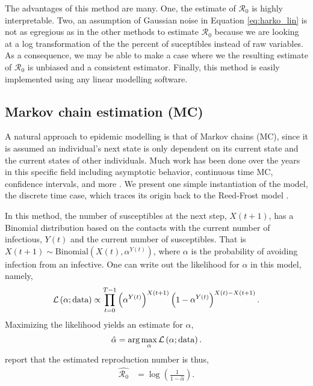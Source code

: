 \message{ !name(draft_v13.tex)}\documentclass[12pt]{article}
\newcommand{\rr}{\ensuremath{\mathcal{R}_0}}
\begin{document}
The advantages of this method are many.  One, the estimate of $\rr$ is highly interpretable.  Two, an assumption of Gaussian noise in Equation \ref{eq:harko_lin} is not as egregious as in the other methods to estimate $\rr$ because we are looking at a log transformation of the the percent of suceptibles instead of raw variables.  As a consequence, we may be able to make a case where we the resulting estimate of $\rr$ is unbiased and a consistent estimator.  Finally,  this method is easily implemented using any linear modelling software.  

\subsection{Markov chain estimation (MC)}
A natural approach to epidemic modelling is that of Markov chains (MC), since it is assumed an individual's next state is only dependent on its current state and the current states of other individuals.  Much work has been done over the years in this specific field including asymptotic behavior, continuous time MC, confidence intervals, and more \citep{jacquez1991,gani1995,daley2001epidemic}.  We present one simple instantiation of the model, the discrete time case, which traces its origin back to the Reed-Frost model \citep{abbey1952}.

In this method, the number of susceptibles at the next step, $X(t+1)$, has a Binomial distribution based on the contacts with the current number of infectious, $Y(t)$ and the current number of susceptibles.  That is $X(t+1) \sim \text{Binomial}\left(X(t), \alpha^{Y(t)}\right)$, where $\alpha$ is the probability of avoiding infection from an infective.  One can write out the likelihood for $\alpha$ in this model, namely,
\begin{align*}
\mathcal{L}\left ( \alpha ; \textnormal{data}\right ) \propto \prod_{t=0}^{T-1}\left ( \alpha^{Y(t)} \right )^{X(t+1)} \left (1- \alpha^{Y(t)} \right )^{X(t) - X(t+1)}.
\end{align*}
Maximizing the likelihood yields an estimate for $\alpha$,
\begin{align*}
\hat{\alpha} = \arg \max_{\alpha} \mathcal{L}\left(\alpha; \textnormal{data} \right ).
  \end{align*}
 \cite{barbour2004} report that the estimated reproduction number is thus,
\begin{align}\label{eq:r0-mc}
\hat{\rr} &= \log \left ( \frac{1}{1-\hat{\alpha}}\right ).
\end{align}
\end{document}
